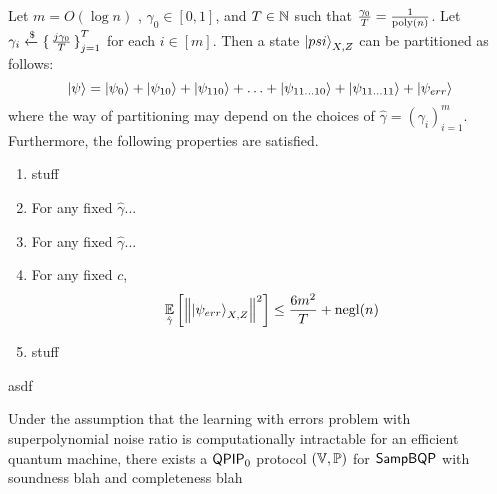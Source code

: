 \begin{lem}
	Let $m=O(\log n)$ , $\gamma_0\in[0, 1]$, and $T\in\mathbb{N}$ such that $\frac{\gamma_0}{T}=\frac{1}{\operatorname*{\operatorname{poly}}(n)}$.
	Let $\gamma_i\xleftarrow{\$}\set{\frac{j\gamma_0}{T}}^T_{j=1}$  for each $i\in[m]$.
	Then a state $\ket{psi}_{X, Z}$ can be partitioned as follows: 
	$$\ket{\psi}=\ket{\psi_0}+\ket{\psi_{10}}+\ket{\psi_{110}}+\ldots+\ket{\psi_{11\ldots10}}+\ket{\psi_{11\ldots11}}+\ket{\psi_{err}}$$
	where the way of partitioning may depend on the choices of $\hat\gamma=(\gamma_i)_{i=1}^m$.
	Furthermore, the following properties are satisfied. 
	\begin{enumerate}
		\item stuff
		\item For any fixed $\hat\gamma$... 
		\item For any fixed $\hat\gamma$...
		\item For any fixed $c$,
			$$\operatorname*{\mathbb{E}}_{\hat\gamma}\left[\left\lVert\ket{\psi_{err}}_{X,Z}\right\rVert^2\right]\leq\frac{6m^2}{T}+\operatorname{negl}(n)$$
		\item stuff
	\end{enumerate}
\end{lem}
    asdf
\begin{cor}
    
	Under the assumption that the learning with errors problem with superpolynomial noise ratio is computationally intractable for an efficient quantum machine, there exists a $\operatorname{\mathsf{QPIP}}_0$ protocol $(\mathbb{V}, \mathbb{P})$ for $\operatorname{\mathsf{SampBQP}}$ with soundness blah and completeness blah
	
\end{cor}
